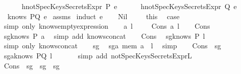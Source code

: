 \begin{isabellebody}
\ \ \ \ \ \ h{}{\isacharcolon}{\isachardoublequoteopen}notSpecKeysSecretsExpr\ P\ e{\isachardoublequoteclose}\isanewline
\ \ \ \ \ \ h{}{\isacharcolon}{\isachardoublequoteopen}notSpecKeysSecretsExpr\ Q\ e{\isachardoublequoteclose}\ \isanewline
\ \ {\isachardoublequoteopen}knows\ PQ\ e{\isachardoublequoteclose}\isanewline
%
\isadelimproof
%
\endisadelimproof
%
\isatagproof
{}\isamarkupfalse%
\ assms\isanewline
{}\isamarkupfalse%
\ {\isacharparenleft}induct\ e{\isacharparenright}\isanewline
\ \ \isamarkupfalse%
\ Nil\ \isanewline
\ \ \isamarkupfalse%
\ this\ \isamarkupfalse%
\ {\isacharquery}case\ \isamarkupfalse%
\ {\isacharparenleft}simp\ only{\isacharcolon}\ knows{\isacharunderscore}emptyexpression{\isacharparenright}\isanewline
{}\isamarkupfalse%
\isanewline
\ \ \isamarkupfalse%
\ a\ l\ \isanewline
\ \ \isamarkupfalse%
\ {\isacharparenleft}Cons\ a\ l{\isacharparenright}\isanewline
\ \ \isamarkupfalse%
\ Cons\ \isamarkupfalse%
\ sg{}{\isacharcolon}{\isachardoublequoteopen}knows\ P\ {\isacharbrackleft}a{\isacharbrackright}{\isachardoublequoteclose}\ \isamarkupfalse%
\ {\isacharparenleft}simp\ add{\isacharcolon}\ knows{\isacharunderscore}concat{\isacharunderscore}{}{\isacharparenright}\isanewline
\ \ \isamarkupfalse%
\ Cons\ \isamarkupfalse%
\ sg{}{\isacharcolon}{\isachardoublequoteopen}knows\ P\ l{\isachardoublequoteclose}\ \isamarkupfalse%
\ {\isacharparenleft}simp\ only{\isacharcolon}\ knows{\isacharunderscore}concat{\isacharunderscore}{}{\isacharparenright}\isanewline
\ \ \isamarkupfalse%
\ sg{}\ \isamarkupfalse%
\ sg{}{\isacharcolon}{\isachardoublequoteopen}a\ mem\ {\isacharparenleft}a\ {\isacharhash}\ l{\isacharparenright}{\isachardoublequoteclose}\ \isamarkupfalse%
\ simp\isanewline
\ \ \isamarkupfalse%
\ Cons\ \ sg{}\ \isamarkupfalse%
\ sg{}a{\isacharcolon}{\isachardoublequoteopen}knows\ PQ\ l{\isachardoublequoteclose}\ \isanewline
\ \ \ \ \isamarkupfalse%
\ {\isacharparenleft}simp\ add{\isacharcolon}\ notSpecKeysSecretsExpr{\isacharunderscore}L{}{\isacharparenright}\isanewline
\ \ \isamarkupfalse%
\ Cons\ \ sg{}\ \ sg{}\ \ sg{}\ \isamarkupfalse%

\end{isabellebody}
